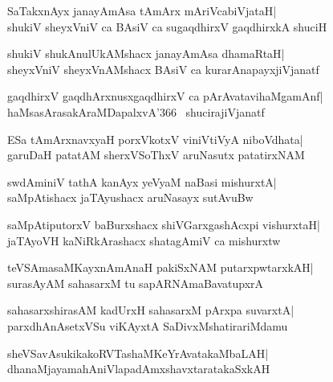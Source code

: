 \documentclass[twoside,12pt,openright]{book}
\newcounter{shloka}[chapter]
\begin{document}
\begin{shloka}%
SaTakxnAyx janayAmAsa tAmArx mAriVcabiVjataH|\\
shukiV sheyxVniV ca BAsiV ca sugaqdhirxV gaqdhirxkA shuciH
\end{shloka}

\begin{shloka}%
shukiV shukAnulUkAMshacx janayAmAsa dhamaRtaH|\\
sheyxVniV sheyxVnAMshacx BAsiV ca kurarAnapayxjiVjanatf
\end{shloka}

\begin{shloka}%
gaqdhirxV gaqdhArxnusxgaqdhirxV ca pArAvatavihaMgamAnf|\\
haMsasArasakAraMDapalxvA\char'366~ shucirajiVjanatf
\end{shloka}

\begin{shloka}%
ESa tAmArxnavxyaH porxVkotxV viniVtiVyA niboVdhata|\\
garuDaH patatAM sherxVSoThxV aruNasutx patatirxNAM
\end{shloka}

\begin{shloka}%
swdAminiV tathA kanAyx yeVyaM naBasi mishurxtA|\\
saMpAtishacx jaTAyushacx aruNasayx sutAvuBw
\end{shloka}

\begin{shloka}%
saMpAtiputorxV baBurxshacx shiVGarxgashAcxpi vishurxtaH|\\
jaTAyoVH kaNiRkArashacx shatagAmiV ca mishurxtw
\end{shloka}

\begin{shloka}%
teVSAmasaMKayxnAmAnaH pakiSxNAM putarxpwtarxkAH|\\
surasAyAM sahasarxM tu sapARNAmaBavatupxrA
\end{shloka}

\begin{shloka}%
sahasarxshirasAM kadUrxH sahasarxM pArxpa suvarxtA|\\
parxdhAnAsetxVSu viKAyxtA SaDivxMshatirariMdamu
\end{shloka}

\begin{shloka}%
sheVSavAsukikakoRVTashaMKeYrAvatakaMbaLAH|\\
dhanaMjayamahAniVlapadAmxshavxtaratakaSxkAH
\end{shloka}
\end{document}
